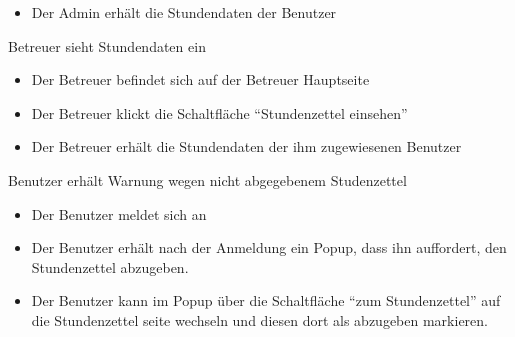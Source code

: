 \begin{requirements}
\begin{itemize}
		\item Der Admin erhält die Stundendaten der Benutzer
	\end {itemize}
	 Betreuer sieht Stundendaten ein
	\begin{itemize}
		\item Der Betreuer befindet sich auf der Betreuer Hauptseite
		\item Der Betreuer klickt die Schaltfläche "`Stundenzettel einsehen"'
		\item Der Betreuer erhält die Stundendaten der ihm zugewiesenen Benutzer
	\end {itemize}
	 Benutzer erhält Warnung wegen nicht abgegebenem Studenzettel
            \begin{itemize}
		\item Der Benutzer meldet sich an
		\item Der Benutzer erhält nach der Anmeldung ein Popup, dass ihn auffordert, den Stundenzettel abzugeben.
		\item Der Benutzer kann im Popup über die Schaltfläche "`zum Stundenzettel"' auf die Stundenzettel seite wechseln und diesen dort als abzugeben markieren.
	\end {itemize}

\end{requirements}
